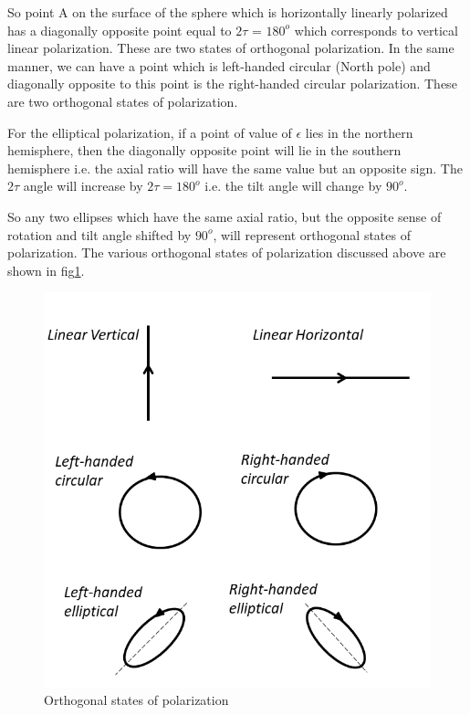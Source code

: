 So point A on the surface of the sphere which is horizontally linearly polarized has a diagonally opposite point equal to $2\tau$ = $180^{o}$ which corresponds to vertical linear polarization. These are two states of orthogonal polarization. In the same manner, we can have a point which is left-handed circular (North pole) and diagonally opposite to this point is the right-handed circular polarization. These are two orthogonal states of polarization.

For the elliptical polarization, if a point of value of $\epsilon$ lies in the northern hemisphere, then the diagonally opposite point will lie in the southern hemisphere i.e. the axial ratio will have the same value but an opposite sign. The $2\tau$ angle will increase by $2\tau = 180^{o}$ i.e. the tilt angle will change by $90^{o}$.

So any two ellipses which have the same axial ratio, but the opposite sense of rotation and tilt angle shifted by $90^{o}$, will represent orthogonal states of polarization. The various orthogonal states of polarization discussed above are shown in fig\ref{fig:orthogonal_states_of_polarization}.

\begin{figure}[h]
\centering
\includegraphics[width=0.9\linewidth]{"./graphics/orthogonal_states"}
\caption{Orthogonal states of polarization}
\label{fig:orthogonal_states_of_polarization}
\end{figure}

